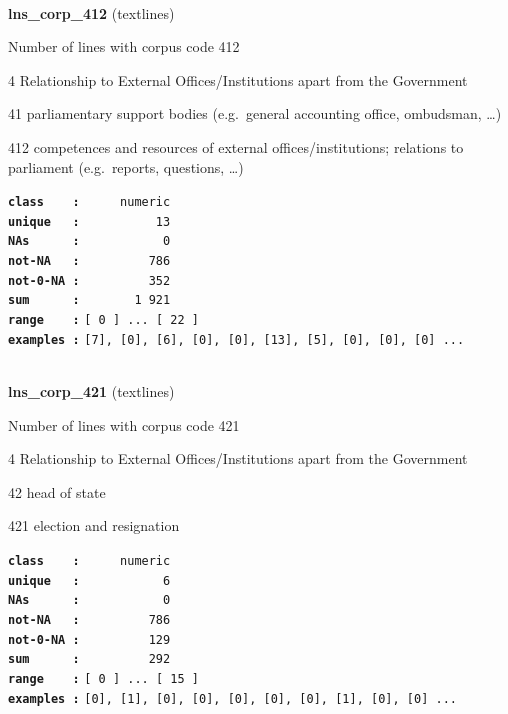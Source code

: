 \documentclass[]{article}
\begin{document}
~

\textbf{lns\_corp\_412} (textlines)

Number of lines with corpus code 412

4 Relationship to External Offices/Institutions apart from the
Government

41 parliamentary support bodies (e.g.~general accounting office,
ombudsman, \ldots{})

412 competences and resources of external offices/institutions;
relations to parliament (e.g.~reports, questions, \ldots{})

\textbf{\texttt{class\ \ \ \ :}} \texttt{~~~~~numeric}\\
\textbf{\texttt{unique\ \ \ :}} \texttt{~~~~~~~~~~13}\\
\textbf{\texttt{NAs\ \ \ \ \ \ :}} \texttt{~~~~~~~~~~~0}\\
\textbf{\texttt{not-NA\ \ \ :}} \texttt{~~~~~~~~~786}\\
\textbf{\texttt{not-0-NA\ :}} \texttt{~~~~~~~~~352}\\
\textbf{\texttt{sum\ \ \ \ \ \ :}} \texttt{~~~~~~~1~921}\\
\textbf{\texttt{range\ \ \ \ :}}
\texttt{{[}\ 0\ {]}\ ...\ {[}\ 22\ {]}}\\
\textbf{\texttt{examples\ :}}
\texttt{{[}7{]},\ {[}0{]},\ {[}6{]},\ {[}0{]},\ {[}0{]},\ {[}13{]},\ {[}5{]},\ {[}0{]},\ {[}0{]},\ {[}0{]}\ ...}\\

~

\textbf{lns\_corp\_421} (textlines)

Number of lines with corpus code 421

4 Relationship to External Offices/Institutions apart from the
Government

42 head of state

421 election and resignation

\textbf{\texttt{class\ \ \ \ :}} \texttt{~~~~~numeric}\\
\textbf{\texttt{unique\ \ \ :}} \texttt{~~~~~~~~~~~6}\\
\textbf{\texttt{NAs\ \ \ \ \ \ :}} \texttt{~~~~~~~~~~~0}\\
\textbf{\texttt{not-NA\ \ \ :}} \texttt{~~~~~~~~~786}\\
\textbf{\texttt{not-0-NA\ :}} \texttt{~~~~~~~~~129}\\
\textbf{\texttt{sum\ \ \ \ \ \ :}} \texttt{~~~~~~~~~292}\\
\textbf{\texttt{range\ \ \ \ :}}
\texttt{{[}\ 0\ {]}\ ...\ {[}\ 15\ {]}}\\
\textbf{\texttt{examples\ :}}
\texttt{{[}0{]},\ {[}1{]},\ {[}0{]},\ {[}0{]},\ {[}0{]},\ {[}0{]},\ {[}0{]},\ {[}1{]},\ {[}0{]},\ {[}0{]}\ ...}\\
\end{document}
